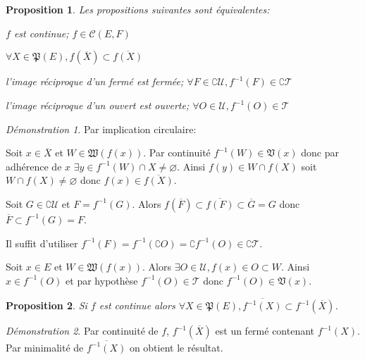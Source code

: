 \documentclass[a4paper, 11pt, french]{book}
\newenvironment{itemise}{\itemize}{\enditemize}
\theoremstyle{plain} %
\newtheorem{proposition}{Proposition}
\theoremstyle{definition} %
\theoremstyle{remark} %
\newtheorem*{demonstration}{Démonstration}
\newcommand{\1}{\mathds{1}}
\newcommand\vide{\varnothing}
\newcommand{\cont}{\mathcal{C}}
\newcommand{\inv}[1]{#1^{-1}}
\begin{document}
\begin{proposition}
	Les propositions suivantes sont équivalentes:
	\begin{itemise}
		\item $f$ est continue; $f\in\cont(E, F)$
		\item $\forall X\in\mathfrak{P}(E), f(\overline{X})\subset\overline{f(X)}$
		\item l'image réciproque d'un fermé est fermée; $\forall F\in\complement\mathscr{U}, \inv{f}(F)\in\complement\mathscr{T}$
		\item l'image réciproque d'un ouvert est ouverte; $\forall O\in\mathscr{U}, \inv{f}(O)\in\mathscr{T}$
	\end{itemise}
\end{proposition}

\begin{demonstration}
	Par implication circulaire:
	\begin{itemise}
		\item Soit $x\in\overline{X}$ et $W\in\mathfrak{W}(f(x))$.
		Par continuité $\inv{f}(W)\in\mathfrak{V}(x)$ donc par adhérence de $x$ $\exists y\in\inv{f}(W)\cap X\neq\vide$.
		Ainsi $f(y)\in W\cap f(X)$ soit $W\cap f(X)\neq\vide$ donc $f(x)\in\overline{f(X)}$.
		\item Soit $G\in\complement\mathscr{U}$ et $F=\inv{f}(G)$.
		Alors $f(\overline{F})\subset\overline{f(F)}\subset\overline{G}=G$ donc $\overline{F}\subset\inv{f}(G)=F$.
		\item Il suffit d'utiliser $\inv{f}(F)=\inv{f}(\complement O)=\complement\inv{f}(O)\in\complement\mathscr{T}$.
		\item Soit $x\in E$ et $W\in\mathfrak{W}(f(x))$.
		Alors $\exists O\in\mathscr{U}, f(x)\in O\subset W$.
		Ainsi $x\in\inv{f}(O)$ et par hypothèse $\inv{f}(O)\in\mathscr{T}$ donc $\inv{f}(O)\in\mathfrak{V}(x)$.
	\end{itemise}
\end{demonstration}

\begin{proposition}
	Si $f$ est continue alors $\forall X\in\mathfrak{P}(E), \overline{\inv{f}(X)}\subset\inv{f}(\overline{X})$.
\end{proposition}

\begin{demonstration}
	Par continuité de $f$, $\inv{f}(\overline{X})$ est un fermé contenant $\inv{f}(X)$.
	Par minimalité de $\overline{\inv{f}(X)}$ on obtient le résultat.
\end{demonstration}
\end{document}
